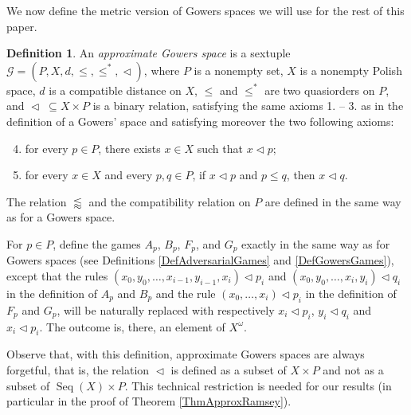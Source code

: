 \documentclass[a4paper,11pt]{article}
\theoremstyle{definition}
\newtheorem{defin}[thm]{Definition}
\numberwithin{equation}{section}
\newcommand{\G}{\mathcal{G}}
\DeclareMathOperator{\Seq}{Seq}
\begin{document}
We now define the metric version of Gowers spaces we will use for the rest of this paper.

\begin{defin}

An \emph{approximate Gowers space} is a sextuple $\G = (P, X, d, \leqslant, \leqslant^*, \vartriangleleft)$, where $P$ is a nonempty set, $X$ is a nonempty Polish space, $d$ is a compatible distance on $X$, $\leqslant$ and $\leqslant^*$ are two quasiorders on $P$, and $\vartriangleleft \;\subseteq X \times P$ is a binary relation, satisfying the same axioms 1. -- 3. as in the definition of a Gowers' space and satisfying moreover the two following axioms:

\begin{enumerate}

\setcounter{enumi}{3}

\item for every $p \in P$, there exists $x \in X$ such that $x \vartriangleleft p$;

\item for every $x \in X$ and every $p, q \in P$, if $x \vartriangleleft p$ and $p\leqslant q$, then $x \vartriangleleft q$.

\end{enumerate}

\noindent The relation $\lessapprox$ and the compatibility relation on $P$ are defined in the same way as for a Gowers space.

\smallskip

For $p \in P$, define the games $A_p$, $B_p$, $F_p$, and $G_p$ exactly in the same way as for Gowers spaces (see Definitions \ref{DefAdversarialGames} and \ref{DefGowersGames}), except that the rules $(x_0, y_0, \ldots, x_{i - 1}, y_{i - 1}, x_i) \vartriangleleft p_i$ and $(x_0, y_0, \ldots, x_i, y_i) \vartriangleleft q_i$ in the definition of $A_p$ and $B_p$ and the rule $(x_0, \ldots, x_i) \vartriangleleft p_i$ in the definition of $F_p$ and $G_p$,  will be naturally replaced with respectively $x_i \vartriangleleft p_i$, $y_i \vartriangleleft q_i$ and $x_i \vartriangleleft p_i$. The outcome is, there, an element of $X^\omega$.

\end{defin}

Observe that, with this definition, approximate Gowers spaces are always forgetful, that is, the relation $\vartriangleleft$ is defined as a subset of $X \times P$ and not as a subset of $\Seq(X) \times P$.
This technical restriction is needed for our results (in particular in the proof of Theorem \ref{ThmApproxRamsey}).
\end{document}
